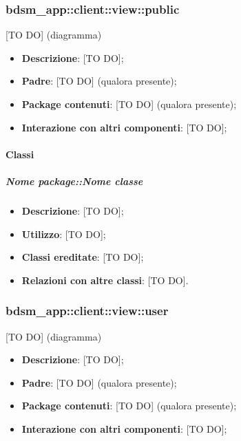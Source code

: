 

	\subsubsection{bdsm\_app::client::view::public} %
	\label{ssub:bdsm_app_client_view_public}
	[TO DO] (diagramma) \newline \newline

	\begin{itemize}
		\item \textbf{Descrizione}: [TO DO];
		\item \textbf{Padre}: [TO DO] (qualora presente);
		\item \textbf{Package contenuti}: [TO DO] (qualora presente);
		\item \textbf{Interazione con altri componenti}: [TO DO];
	\end{itemize}

		\paragraph{Classi} %
			\subparagraph{Nome package::Nome classe} %
			\label{subp:subparagraph_name}
				\begin{itemize}
					\item \textbf{Descrizione}: [TO DO];
					\item \textbf{Utilizzo}: [TO DO];
					\item \textbf{Classi ereditate}: [TO DO];
					\item \textbf{Relazioni con altre classi}: [TO DO].
				\end{itemize}


	\subsubsection{bdsm\_app::client::view::user} %
	\label{ssub:bdsm_app_client_view_user}
	[TO DO] (diagramma) \newline \newline

	\begin{itemize}
		\item \textbf{Descrizione}: [TO DO];
		\item \textbf{Padre}: [TO DO] (qualora presente);
		\item \textbf{Package contenuti}: [TO DO] (qualora presente);
		\item \textbf{Interazione con altri componenti}: [TO DO];
	\end{itemize}

